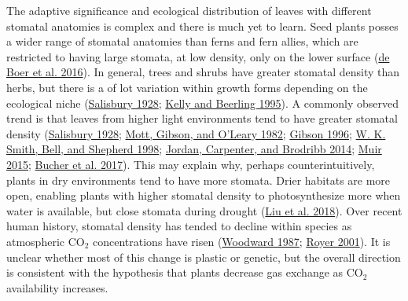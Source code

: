 \documentclass[
  12pt,
]{article}
\begin{document}
The adaptive significance and ecological distribution of leaves with different stomatal anatomies is complex and there is much yet to learn. Seed plants posses a wider range of stomatal anatomies than ferns and fern allies, which are restricted to having large stomata, at low density, only on the lower surface (\protect\hyperlink{ref-de_boer_optimal_2016}{de Boer et al. 2016}). In general, trees and shrubs have greater stomatal density than herbs, but there is a of lot variation within growth forms depending on the ecological niche (\protect\hyperlink{ref-salisbury_i_1928}{Salisbury 1928}; \protect\hyperlink{ref-kelly_plant_1995}{Kelly and Beerling 1995}). A commonly observed trend is that leaves from higher light environments tend to have greater stomatal density (\protect\hyperlink{ref-salisbury_i_1928}{Salisbury 1928}; \protect\hyperlink{ref-mott_adaptive_1982}{Mott, Gibson, and O'Leary 1982}; \protect\hyperlink{ref-gibson_structure-function_1996}{Gibson 1996}; \protect\hyperlink{ref-smith_associations_1998}{W. K. Smith, Bell, and Shepherd 1998}; \protect\hyperlink{ref-jordan_using_2014}{Jordan, Carpenter, and Brodribb 2014}; \protect\hyperlink{ref-muir_making_2015}{Muir 2015}; \protect\hyperlink{ref-bucher_stomatal_2017}{Bucher et al. 2017}). This may explain why, perhaps counterintuitively, plants in dry environments tend to have more stomata. Drier habitats are more open, enabling plants with higher stomatal density to photosynthesize more when water is available, but close stomata during drought (\protect\hyperlink{ref-liu_variation_2018}{Liu et al. 2018}). Over recent human history, stomatal density has tended to decline within species as atmospheric CO\(_2\) concentrations have risen (\protect\hyperlink{ref-woodward_stomatal_1987}{Woodward 1987}; \protect\hyperlink{ref-royer_stomatal_2001}{Royer 2001}). It is unclear whether most of this change is plastic or genetic, but the overall direction is consistent with the hypothesis that plants decrease gas exchange as CO\(_2\) availability increases.
\end{document}
